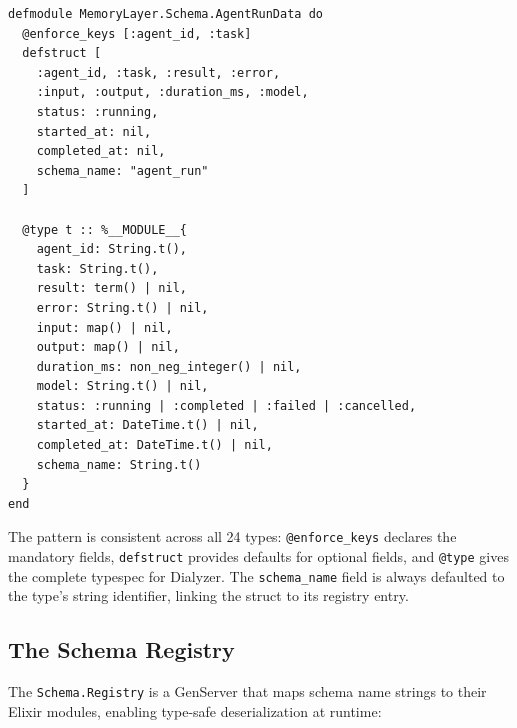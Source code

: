 \documentclass[12pt,a4paper]{article}
\theoremstyle{definition}
\begin{document}
\begin{lstlisting}[caption={AgentRunData: execution trace of an agent invocation.}, label={lst:agent-run}]
defmodule MemoryLayer.Schema.AgentRunData do
  @enforce_keys [:agent_id, :task]
  defstruct [
    :agent_id, :task, :result, :error,
    :input, :output, :duration_ms, :model,
    status: :running,
    started_at: nil,
    completed_at: nil,
    schema_name: "agent_run"
  ]

  @type t :: %__MODULE__{
    agent_id: String.t(),
    task: String.t(),
    result: term() | nil,
    error: String.t() | nil,
    input: map() | nil,
    output: map() | nil,
    duration_ms: non_neg_integer() | nil,
    model: String.t() | nil,
    status: :running | :completed | :failed | :cancelled,
    started_at: DateTime.t() | nil,
    completed_at: DateTime.t() | nil,
    schema_name: String.t()
  }
end
\end{lstlisting}

The pattern is consistent across all 24 types: \texttt{@enforce\_keys} declares the mandatory fields, \texttt{defstruct} provides defaults for optional fields, and \texttt{@type} gives the complete typespec for Dialyzer.
The \texttt{schema\_name} field is always defaulted to the type's string identifier, linking the struct to its registry entry.

\subsection{The Schema Registry}\label{subsec:registry}

The \texttt{Schema.Registry} is a GenServer that maps schema name strings to their Elixir modules, enabling type-safe deserialization at runtime:
\end{document}

